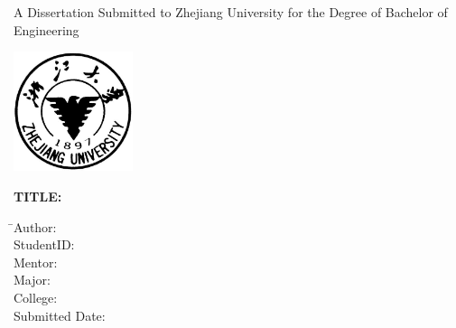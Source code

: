 
\newpage
\thispagestyle{empty}

\vspace{5mm}

\begin{center}
    \songti\xiaoyi A Dissertation Submitted to Zhejiang University for the Degree of Bachelor of Engineering
\end{center}

\vspace{4mm}

\begin{center}
  \includegraphics[width=35mm]{images/standxb}
\end{center}

\vspace{25mm}

{\hspace{3mm}\songti\sanhao\bfseries TITLE:\hspace{4mm}\begin{minipage}[t]{124mm}\end{minipage}}

\vspace{7mm}

\begin{tabbing}
    \hspace{18mm} \= \sanhao Author:\hspace{19mm} \= \underline{\makebox[6cm]{\sanhao\zjuauthornamee}} \\[2mm]
    \> \sanhao StudentID:\hspace{19mm} \> \underline{\makebox[6cm]{\sanhao\zjuauthorid}} \\[2mm]
    \> \sanhao Mentor:\hspace{19mm} \> \underline{\makebox[6cm]{\sanhao\zjumentore}} \\[2mm]
    \> \sanhao Major:\hspace{19mm} \> \underline{\makebox[6cm]{\sanhao\zjumajore}} \\[2mm]
    \> \sanhao College: \> \underline{\makebox[6cm]{\sanhao\zjucollegee}} \\[2mm]
    \> \sanhao Submitted Date: \> \underline{\makebox[6cm]{\sanhao\zjusubmitdate}}
\end{tabbing}

